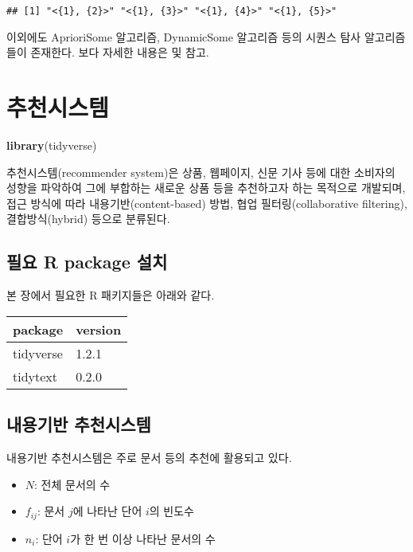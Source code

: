 \documentclass[]{book}
\newenvironment{Shaded}{\begin{snugshade}}{\end{snugshade}}
\newcommand{\KeywordTok}[1]{\textcolor[rgb]{0.13,0.29,0.53}{\textbf{#1}}}
\newcommand{\NormalTok}[1]{#1}
\providecommand{\tightlist}{%
  \setlength{\itemsep}{0pt}\setlength{\parskip}{0pt}}
\begin{document}
\begin{verbatim}
## [1] "<{1}, {2}>" "<{1}, {3}>" "<{1}, {4}>" "<{1}, {5}>"
\end{verbatim}

이외에도 AprioriSome 알고리즘, DynamicSome 알고리즘 등의 시퀀스 탐사 알고리즘 들이 존재한다. 보다 자세한 내용은 \citet{jun2012datamining} 및 \citet{agrawal1995mining} 참고.

\hypertarget{recommender-system}{%
\chapter{추천시스템}\label{recommender-system}}

\begin{Shaded}
\begin{Highlighting}[]
\KeywordTok{library}\NormalTok{(tidyverse)}
\end{Highlighting}
\end{Shaded}

추천시스템(recommender system)은 상품, 웹페이지, 신문 기사 등에 대한 소비자의 성향을 파악하여 그에 부합하는 새로운 상품 등을 추천하고자 하는 목적으로 개발되며, 접근 방식에 따라 내용기반(content-based) 방법, 협업 필터링(collaborative filtering), 결합방식(hybrid) 등으로 분류된다.

\hypertarget{recommender-packages-install}{%
\section{필요 R package 설치}\label{recommender-packages-install}}

본 장에서 필요한 R 패키지들은 아래와 같다.

\begin{tabular}{l|l}
\hline
package & version\\
\hline
tidyverse & 1.2.1\\
\hline
tidytext & 0.2.0\\
\hline
\end{tabular}

\hypertarget{content-based-recommender}{%
\section{내용기반 추천시스템}\label{content-based-recommender}}

내용기반 추천시스템은 주로 문서 등의 추천에 활용되고 있다.

\begin{itemize}
\tightlist
\item
  \(N\): 전체 문서의 수
\item
  \(f_{ij}\): 문서 \(j\)에 나타난 단어 \(i\)의 빈도수
\item
  \(n_i\): 단어 \(i\)가 한 번 이상 나타난 문서의 수
\end{itemize}
\end{document}
